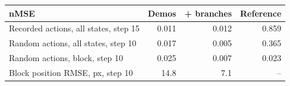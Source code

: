 \begin{tabular}{lrrr}
\toprule
nMSE & Demos & + branches & Reference \\
\midrule
Recorded actions, all states, step 15 & 0.011 & 0.012 & 0.859 \\
Random actions, all states, step 10 & 0.017 & 0.005 & 0.365 \\
Random actions, block, step 10 & 0.025 & 0.007 & 0.023 \\
\midrule
Block position RMSE, px, step 10 & 14.8 & 7.1 & -- \\
\bottomrule
\end{tabular}
